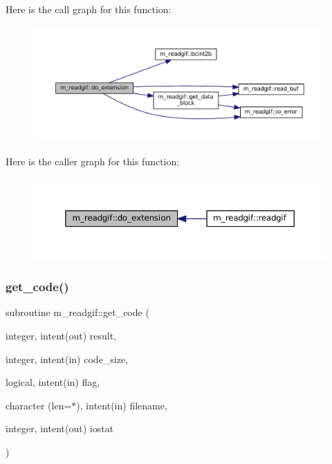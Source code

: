 Here is the call graph for this function\+:\nopagebreak
\begin{figure}[H]
\begin{center}
\leavevmode
\includegraphics[width=350pt]{namespacem__readgif_a93c5f69ee5054ba2c10ed17b8ab53f6b_cgraph}
\end{center}
\end{figure}
Here is the caller graph for this function\+:\nopagebreak
\begin{figure}[H]
\begin{center}
\leavevmode
\includegraphics[width=350pt]{namespacem__readgif_a93c5f69ee5054ba2c10ed17b8ab53f6b_icgraph}
\end{center}
\end{figure}
\mbox{\label{namespacem__readgif_a027fedbf7ba68763483988c1aa6d2cea}} 
\subsubsection{\texorpdfstring{get\+\_\+code()}{get\_code()}}
{\footnotesize\ttfamily subroutine m\+\_\+readgif\+::get\+\_\+code (\begin{DoxyParamCaption}\item[{integer, intent(out)}]{result,  }\item[{integer, intent(in)}]{code\+\_\+size,  }\item[{logical, intent(in)}]{flag,  }\item[{character (len=$\ast$), intent(in)}]{filename,  }\item[{integer, intent(out)}]{iostat }\end{DoxyParamCaption})\hspace{0.3cm}{\ttfamily [private]}}



